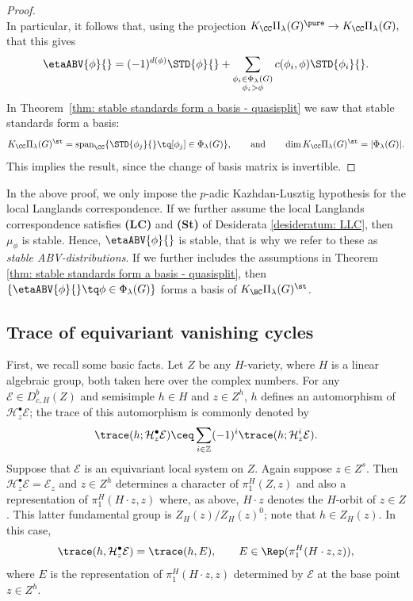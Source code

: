 \documentclass[11pt,letterpaper]{amsart}
\numberwithin{equation}{section}
\begin{document}
\begin{proof}
\begin{equation}
    \end{equation}
In particular, it follows that, using the projection 
$
K_\CC \Pi_\lambda(G)^{\pure} 
\to
K_\CC \Pi_\lambda(G),
$
that this gives
\begin{equation}
        \etaABV{\phi}{}
        =
        (-1)^{d(\phi)}\STD{\phi}{} + \sum_{\substack{\phi_i\in \Phi_{\lambda}(G) \\ \phi_i>\phi}} c(\phi_i,\phi) \STD{\phi_i}{}.
    \end{equation}
In Theorem~\ref{thm: stable standards form a basis - quasisplit}
we saw that stable standards form a basis:
\[
K_\CC \Pi_\lambda(G)^\st 
=
\operatorname{span}_\CC
\lbrace
\STD{\phi_j}{}
\tq
[\phi_j]\in \Phi_\lambda(G) \rbrace,
\qquad\text{and}\qquad
\dim K_\CC \Pi_\lambda(G)^\st  = \vert \Phi_\lambda(G) \vert.
\]
This implies the result, since the change of basis matrix is invertible.
\end{proof}

    In the above proof, we only impose the $p$-adic Kazhdan-Lusztig hypothesis for the local Langlands correspondence. If we further assume the local Langlands correspondence satisfies \textbf{(LC)} and \textbf{(St)} of Desiderata \ref{desideratum: LLC}, then $\mu_{\phi}$ is stable. 
    Hence, $\etaABV{\phi}{}$ is stable, that is why we refer to these as {\it stable ABV-distributions}.
    If we further includes the assumptions in Theorem \ref{thm: stable standards form a basis - quasisplit}, then $\{ \etaABV{\phi}{} 
    \tq 
    \phi \in \Phi_\lambda(G) \}$ forms a basis of $K_{\BC}\Pi_{\lambda}(G)^{\st}$. 



\subsection{Trace of equivariant vanishing cycles}\label{subsection: trace}

First, we recall some basic facts. 
Let $Z$ be any $H$-variety, where $H$ is a linear algebraic group, both taken here over the complex numbers.
For any $\mathcal{E}\in D^b_{c,H}(Z)$ and semisimple $h\in H$ and $z\in Z^h$, $h$ defines an automorphism of $\mathcal{H}^\bullet_{z}\mathcal{E}$; the trace of this automorphism is commonly denoted by 
\[
\trace(h;\mathcal{H}^\bullet_{z}\mathcal{E})
\ceq
\sum_{i\in \mathbb{Z}}(-1)^i \trace(h;\mathcal{H}^i_{z}\mathcal{E}).
\]
Suppose that $\mathcal{E}$ is an equivariant local system on $Z$. Again suppose $z\in Z^s$. Then $\mathcal{H}^\bullet_{z}\mathcal{E} = \mathcal{E}_{z}$ and $z\in Z^h$ determines a character of $\pi_1^H(Z,z)$ and also a representation of $\pi_1^H(H\cdot z,z)$ where, as above, $H\cdot z$ denotes the $H$-orbit of $z\in Z$.
This latter fundamental group is $Z_H(z)/Z_H(z)^0$; note that $h\in Z_{H}(z)$.
In this case, 
\[
\trace(h,\mathcal{H}^\bullet_{z}\mathcal{E}) = \trace(h, E),
\qquad
E\in \Rep(\pi_1^H(H\cdot z,z)),
\]
where $E$ is the representation of $\pi_1^H(H\cdot z,z)$ determined by $\mathcal{E}$ at the base point $z\in Z^h$.
\end{document}
